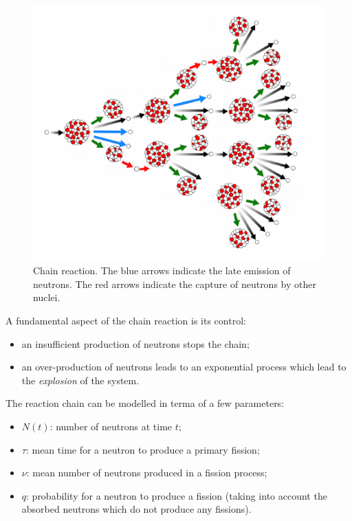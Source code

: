 \begin{figure}
    \centering
    \includegraphics[scale=1.2]{Figures/nuclear-physics3-fig6.pdf}
    \caption{Chain reaction. The blue arrows indicate the late emission of neutrons. The red arrows indicate the capture of neutrons by other nuclei.}
    \label{fig:nuclear-physics3-fig6}
\end{figure}

A fundamental aspect of the chain reaction is its control:
\begin{itemize}
    \item an insufficient production of neutrons stops the chain;
    \item an over-production of neutrons leads to an exponential process which lead to the \emph{explosion} of the system.
\end{itemize}

The reaction chain can be modelled in terma of a few parameters:
\begin{itemize}
    \item \(N(t)\): number of neutrons at time \(t\);
    \item $\tau$: mean time for a neutron to produce a primary fission;
    \item $\nu$: mean number of neutrons produced in a fission process;
    \item \(q\): probability for a neutron to produce a fission (taking into account the absorbed neutrons which do not produce any fissions).
\end{itemize}

